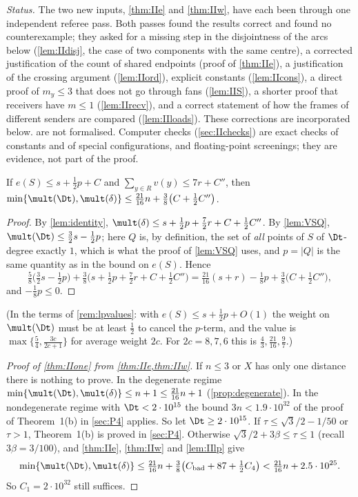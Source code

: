 \emph{Status.} The two new inputs, \cref{thm:IIe} and \cref{thm:IIw}, have each been through one independent referee pass. Both passes found the results correct and found no counterexample; they asked for a missing step in the disjointness of the arcs below (\cref{lem:IIdisj}, the case of two components with the same centre), a corrected justification of the count of shared endpoints (proof of \cref{thm:IIe}), a justification of the crossing argument (\cref{lem:IIord}), explicit constants (\cref{lem:IIcons}), a direct proof of $m_y\le3$ that does not go through fans (\cref{lem:IIS}), a shorter proof that receivers have $m\le1$ (\cref{lem:IIrecv}), and a correct statement of how the frames of different senders are compared (\cref{lem:IIloads}). These corrections are incorporated below.  are not formalised. Computer checks (\cref{sec:IIchecks}) are exact checks of constants and of special configurations, and floating-point screenings; they are evidence, not part of the proof.

\begin{lemma}\label{lem:IIlp}
If $e(S)\le s+\frac12p+C$ and $\sum_{y\in R}v(y)\le7r+C''$, then $\min\{\mult(\Dt),\mult(\delta)\}\le\frac{21}{16}n+\frac38\bigl(C+\frac12C''\bigr)$.
\end{lemma}
\begin{proof}
By \cref{lem:identity}, $\mult(\delta)\le s+\frac12p+\frac72r+C+\frac12C''$. By \cref{lem:VSQ}, $\mult(\Dt)\le\frac32s-\frac12p$; here $Q$ is, by definition, the set of \emph{all} points of $S$ of $\Dt$-degree exactly $1$, which is what the proof of \cref{lem:VSQ} uses, and $p=|Q|$ is the same quantity as in the bound on $e(S)$. Hence
\[
\tfrac58\bigl(\tfrac32s-\tfrac12p\bigr)+\tfrac38\bigl(s+\tfrac12p+\tfrac72r+C+\tfrac12C''\bigr)=\tfrac{21}{16}(s+r)-\tfrac18p+\tfrac38\bigl(C+\tfrac12C''\bigr),
\]
and $-\frac18p\le0$.
\end{proof}
(In the terms of \cref{rem:lpvalues}: with $e(S)\le s+\frac12p+O(1)$ the weight on $\mult(\Dt)$ must be at least $\frac12$ to cancel the $p$-term, and the value is $\max\{\frac54,\frac{3c}{2c+1}\}$ for average weight $2c$. For $2c=8,7,6$ this is $\frac43,\frac{21}{16},\frac97$.)

\begin{proof}[Proof of \cref{thm:IIone} from \cref{thm:IIe,thm:IIw}]
If $n\le3$ or $X$ has only one distance there is nothing to prove. In the degenerate regime $\min\{\mult(\Dt),\mult(\delta)\}\le n+1\le\frac{21}{16}n+1$ (\cref{prop:degenerate}). In the nondegenerate regime with $\Dt<2\cdot10^{15}$ the bound $3n<1.9\cdot10^{32}$ of the proof of Theorem~1(b) in \cref{sec:P4} applies. So let $\Dt\ge2\cdot10^{15}$. If $\tau\le\sqrt3/2-1/50$ or $\tau>1$, Theorem~1(b) is proved in \cref{sec:P4}. Otherwise $\sqrt3/2+3\beta\le\tau\le1$ (recall $3\beta=3/100$), and \cref{thm:IIe}, \cref{thm:IIw} and \cref{lem:IIlp} give
\[
\min\{\mult(\Dt),\mult(\delta)\}\le\tfrac{21}{16}n+\tfrac38\bigl(C_{\mathrm{bad}}+87+\tfrac12C_4\bigr)<\tfrac{21}{16}n+2.5\cdot10^{25}.
\]
So $C_1=2\cdot10^{32}$ still suffices.
\end{proof}

